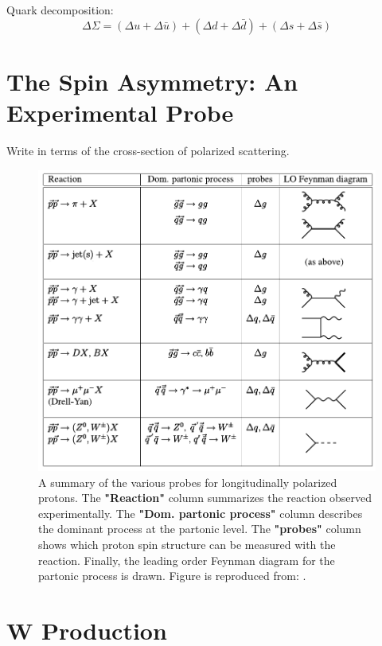 {\noindent}Quark decomposition:
\begin{equation}
  {\Delta \Sigma} =
  {
    (\Delta u+\Delta \bar{u})
    +(\Delta d + \Delta \bar{d})
    +(\Delta s + \Delta \bar{s})
  }
  \label{eq:quark_spin_decomposition}
\end{equation}

\section{The Spin Asymmetry: An Experimental Probe }
Write in terms of the cross-section of polarized scattering.

\begin{figure}[ht]
  \centering
  \includegraphics[width=\linewidth]{./figures/spin_probes.pdf}
  \caption{
    A summary of the various probes for longitudinally polarized protons. The
    \textbf{"Reaction"} column summarizes the reaction observed experimentally.
    The \textbf{"Dom. partonic process"} column describes the dominant process
    at the partonic level. The \textbf{"probes"} column shows which proton spin
    structure can be measured with the reaction. Finally, the leading order
    Feynman diagram for the partonic process is drawn. Figure is reproduced
    from: \cite{Aidala2005}.
  }
  \label{fig:spin_probes_masterspin}

\end{figure}

\section{W Production}



